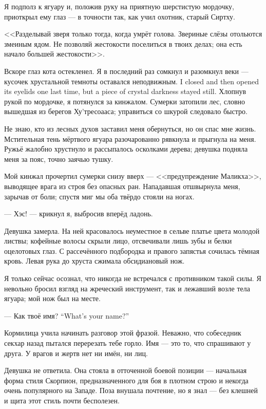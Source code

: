 Я подполз к ягуару и, положив руку на приятную шерстистую мордочку, приоткрыл ему глаз --- в точности так, как учил охотник, старый Сиртху.

<<Разделывай зверя только тогда, когда умрёт голова.
Звериные слёзы отольются змеиным ядом.
Не позволяй жестокости поселиться в твоих делах;
она есть начало большей жестокости>>.

Вскоре глаз кота остекленел.
{Я в последний раз сомкнул и разомкнул веки --- кусочек хрустальной темноты оставался неподвижным.}
{I closed and then opened its eyelids one last time, but a piece of crystal darkness stayed still.}
Хлопнув рукой по мордочке, я потянулся за кинжалом.
Сумерки затопили лес, словно вышедшая из берегов Ху'тресоааса;
управиться со шкурой следовало быстро.

Не знаю, кто из лесных духов заставил меня обернуться, но он спас мне жизнь.
Мстительная тень мёртвого ягуара разочарованно рявкнула и прыгнула на меня.
Ружьё жалобно хрустнуло и рассыпалось осколками дерева;
девушка подняла меня за пояс, точно заячью тушку.

Мой кинжал прочертил сумерки снизу вверх --- <<предупреждение Маликха>>, выводящее врага из строя без опасных ран.
Нападавшая отшвырнула меня, зарычав от боли;
спустя миг мы оба твёрдо стояли на ногах.

--- Хэс\FM! --- крикнул я, выбросив вперёд ладонь.

Девушка замерла.
На ней красовалось неуместное в сельве платье цвета молодой листвы;
кофейные волосы скрыли лицо, отсвечивали лишь зубы и белки оцелотовых глаз.
С рассечённого подбородка и правого запястья сочилась тёмная кровь.
Левая рука до хруста сжимала обсидиановый нож.

Я только сейчас осознал, что никогда не встречался с противником такой силы.
Я невольно бросил взгляд на жреческий инструмент, так и лежавший возле тела ягуара;
мой нож был на месте.

{--- Как твоё имя?}
{``What's your name?''}

Кормилица учила начинать разговор этой фразой.
Неважно, что собеседник секхар назад пытался перерезать тебе горло.
Имя --- это то, что спрашивают у друга.
У врагов и жертв нет ни имён, ни лиц.

Девушка не ответила.
Она стояла в отточенной боевой позиции --- начальная форма стиля Скорпион, предназначенного для боя в плотном строю и некогда очень популярного на Западе.
Поза внушала почтение, но я знал --- без клешней и щита этот стиль почти бесполезен.

